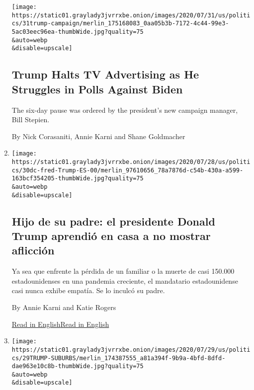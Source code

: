 \begin{enumerate}
  \texttt{[image: https://static01.graylady3jvrrxbe.onion/images/2020/07/31/us/politics/31trump-campaign/merlin\_175168083\_0aa05b3b-7172-4c44-99e3-5ac03eec96ea-thumbWide.jpg?quality=75\\\&auto=webp\\\&disable=upscale]}

  \hypertarget{trump-halts-tv-advertising-as-he-struggles-in-polls-against-biden}{%
  \subsection{Trump Halts TV Advertising as He Struggles in Polls
  Against
  Biden}\label{trump-halts-tv-advertising-as-he-struggles-in-polls-against-biden}}

  The six-day pause was ordered by the president's new campaign manager,
  Bill Stepien.

  By Nick Corasaniti, Annie Karni and Shane Goldmacher
\item
  \href{/es/2020/07/31/espanol/estados-unidos/fred-trump-donald-trump.html}{}

  \texttt{[image: https://static01.graylady3jvrrxbe.onion/images/2020/07/28/us/politics/30dc-fred-Trump-ES-00/merlin\_97610656\_78a7876d-c54b-430a-a599-163bcf354205-thumbWide.jpg?quality=75\\\&auto=webp\\\&disable=upscale]}

  \hypertarget{hijo-de-su-padre-el-presidente-donald-trump-aprendiuxf3-en-casa-a-no-mostrar-aflicciuxf3n}{%
  \subsection{Hijo de su padre: el presidente Donald Trump aprendió en
  casa a no mostrar
  aflicción}\label{hijo-de-su-padre-el-presidente-donald-trump-aprendiuxf3-en-casa-a-no-mostrar-aflicciuxf3n}}

  Ya sea que enfrente la pérdida de un familiar o la muerte de casi
  150.000 estadounidenses en una pandemia creciente, el mandatario
  estadounidense casi nunca exhibe empatía. Se lo inculcó su padre.

  By Annie Karni and Katie Rogers

  \href{https://www.nytimes3xbfgragh.onion/2020/07/28/us/politics/donald-fred-trump.html}{Read
  in
  English}\href{https://www.nytimes3xbfgragh.onion/2020/07/28/us/politics/donald-fred-trump.html}{Read
  in English}
\item
  \href{/2020/07/29/us/politics/trump-suburbs-housing-white-voters.html}{}

  \texttt{[image: https://static01.graylady3jvrrxbe.onion/images/2020/07/29/us/politics/29TRUMP-SUBURBS/merlin\_174387555\_a81a394f-9b9a-4bfd-8dfd-dae963e10c8b-thumbWide.jpg?quality=75\\\&auto=webp\\\&disable=upscale]}


\end{enumerate}
